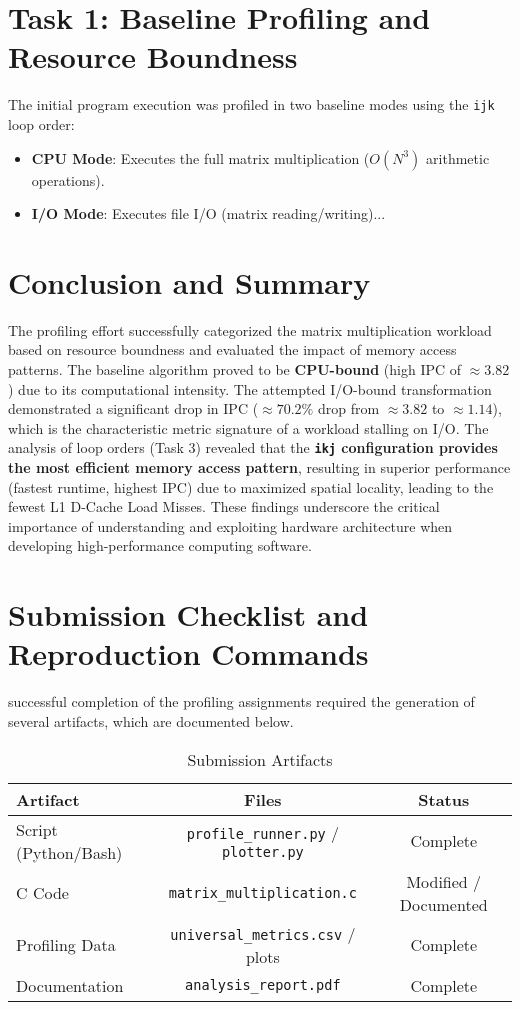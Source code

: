 \documentclass[11pt, a4paper]{article}
\begin{document}
\section{Task 1: Baseline Profiling and Resource Boundness}
The initial program execution was profiled in two baseline modes using the \texttt{ijk} loop order:
\begin{itemize}
    \item \textbf{CPU Mode}: Executes the full matrix multiplication ($O(N^3)$ arithmetic operations).
    \item \textbf{I/O Mode}: Executes file I/O (matrix reading/writing)...
\end{itemize}


\section{Conclusion and Summary}
The profiling effort successfully categorized the matrix multiplication workload based on resource boundness and evaluated the impact of memory access patterns. The baseline algorithm proved to be \textbf{CPU-bound} (high IPC of $\approx 3.82$) due to its computational intensity. The attempted I/O-bound transformation demonstrated a significant drop in IPC ($\approx 70.2\%$ drop from $\approx 3.82$ to $\approx 1.14$), which is the characteristic metric signature of a workload stalling on I/O. The analysis of loop orders (Task 3) revealed that the \textbf{\texttt{ikj} configuration provides the most efficient memory access pattern}, resulting in superior performance (fastest runtime, highest IPC) due to maximized spatial locality, leading to the fewest L1 D-Cache Load Misses. These findings underscore the critical importance of understanding and exploiting hardware architecture when developing high-performance computing software.

\section{Submission Checklist and Reproduction Commands}

\nThe successful completion of the profiling assignments required the generation of several artifacts, which are documented below.

\begin{table}[h]
\centering
\caption{Submission Artifacts}
\label{tab:submission_artifacts}
\begin{tabularx}{\textwidth}{l C C}
\toprule
\textbf{Artifact} & \textbf{Files} & \textbf{Status} \\
\midrule
Script (Python/Bash) & \texttt{profile\_runner.py} / \texttt{plotter.py} & Complete \\
C Code & \texttt{matrix\_multiplication.c} & Modified / Documented \\
Profiling Data & \texttt{universal\_metrics.csv} / plots & Complete \\
Documentation & \texttt{analysis\_report.pdf} & Complete \\
\bottomrule
\end{tabularx}
\end{table}
\end{document}
